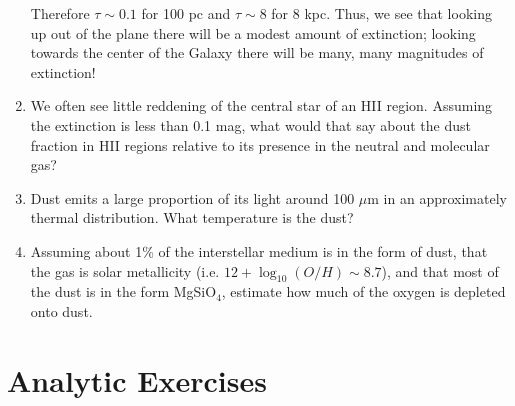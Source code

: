 \begin{enumerate}
\begin{answer}
Therefore $\tau \sim 0.1$ for 100 pc and $\tau\sim 8$ 
for 8 kpc. Thus, we see that looking up out of the plane there will be
a modest amount of extinction; looking towards the center of the
Galaxy there will be many, many magnitudes of extinction!
\end{answer}
\item We often see little reddening of the central star of an HII
region. Assuming the extinction is less than 0.1 mag, what would that
say about the dust fraction in HII regions relative to its presence in
the neutral and molecular gas?
\item Dust emits a large proportion of its light around 100 $\mu$m in
an approximately thermal distribution. What temperature is the dust?
\item Assuming about 1\% of the interstellar medium is in the form of
dust, that the gas is solar metallicity (i.e. $12
+ \log_{10}(O/H) \sim 8.7$), and that most of the dust is in the form
MgSiO$_4$, estimate how much of the oxygen is depleted onto dust.
\end{enumerate}   

\section{Analytic Exercises}

